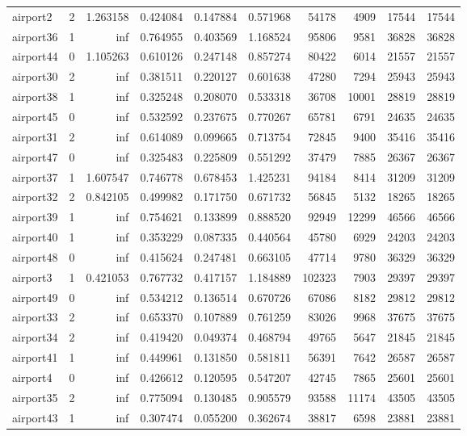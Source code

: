\begin{longtable}{|l|r|r|r|r|r|r|r|r|r|}
airport2 & 2 & 1.263158 & 0.424084 & 0.147884 & 0.571968 & 54178 & 4909 & 17544 & 17544 \\
airport36 & 1 & inf & 0.764955 & 0.403569 & 1.168524 & 95806 & 9581 & 36828 & 36828 \\
airport44 & 0 & 1.105263 & 0.610126 & 0.247148 & 0.857274 & 80422 & 6014 & 21557 & 21557 \\
airport30 & 2 & inf & 0.381511 & 0.220127 & 0.601638 & 47280 & 7294 & 25943 & 25943 \\
airport38 & 1 & inf & 0.325248 & 0.208070 & 0.533318 & 36708 & 10001 & 28819 & 28819 \\
airport45 & 0 & inf & 0.532592 & 0.237675 & 0.770267 & 65781 & 6791 & 24635 & 24635 \\
airport31 & 2 & inf & 0.614089 & 0.099665 & 0.713754 & 72845 & 9400 & 35416 & 35416 \\
airport47 & 0 & inf & 0.325483 & 0.225809 & 0.551292 & 37479 & 7885 & 26367 & 26367 \\
airport37 & 1 & 1.607547 & 0.746778 & 0.678453 & 1.425231 & 94184 & 8414 & 31209 & 31209 \\
airport32 & 2 & 0.842105 & 0.499982 & 0.171750 & 0.671732 & 56845 & 5132 & 18265 & 18265 \\
airport39 & 1 & inf & 0.754621 & 0.133899 & 0.888520 & 92949 & 12299 & 46566 & 46566 \\
airport40 & 1 & inf & 0.353229 & 0.087335 & 0.440564 & 45780 & 6929 & 24203 & 24203 \\
airport48 & 0 & inf & 0.415624 & 0.247481 & 0.663105 & 47714 & 9780 & 36329 & 36329 \\
airport3 & 1 & 0.421053 & 0.767732 & 0.417157 & 1.184889 & 102323 & 7903 & 29397 & 29397 \\
airport49 & 0 & inf & 0.534212 & 0.136514 & 0.670726 & 67086 & 8182 & 29812 & 29812 \\
airport33 & 2 & inf & 0.653370 & 0.107889 & 0.761259 & 83026 & 9968 & 37675 & 37675 \\
airport34 & 2 & inf & 0.419420 & 0.049374 & 0.468794 & 49765 & 5647 & 21845 & 21845 \\
airport41 & 1 & inf & 0.449961 & 0.131850 & 0.581811 & 56391 & 7642 & 26587 & 26587 \\
airport4 & 0 & inf & 0.426612 & 0.120595 & 0.547207 & 42745 & 7865 & 25601 & 25601 \\
airport35 & 2 & inf & 0.775094 & 0.130485 & 0.905579 & 93588 & 11174 & 43505 & 43505 \\
airport43 & 1 & inf & 0.307474 & 0.055200 & 0.362674 & 38817 & 6598 & 23881 & 23881 \\

\end{longtable}

